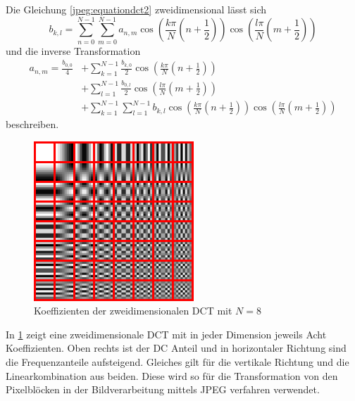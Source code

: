 Die Gleichung \eqref{jpeg:equationdct2} zweidimensional lässt sich
\begin{equation}
    b_{k,l}
    =
    \sum \limits_{n=0}^{N-1} 
    \sum \limits_{m=0}^{N-1} a_{n,m} 
    \cos\left(
    \frac{k\pi}{N}\left(n + \frac{1}{2} \right) 
    \right)
    \cos\left(
    \frac{l\pi}{N}\left(m + \frac{1}{2} \right) 
    \right)
    \label{jpeg:equationdct2dim2}
\end{equation}
und die inverse Transformation  
\begin{align*}
    a_{n,m}
    =
    \frac{b_{0,0}}{4} &+
    \sum \limits_{k=1}^{N-1} 
    \frac{b_{k,0}}{2} 
    \cos\left(
    \frac{k\pi}{N}\left(n + \frac{1}{2} \right) 
    \right) \\ &+
    \sum \limits_{l=1}^{N-1} 
    \frac{b_{0,l}}{2} 
    \cos\left(
    \frac{l\pi}{N}\left(m + \frac{1}{2} \right) 
    \right) \\ &+
    \sum \limits_{k=1}^{N-1} 
    \sum \limits_{l=1}^{N-1} b_{k,l} 
    \cos\left(
    \frac{k\pi}{N}\left(n + \frac{1}{2} \right) 
    \right)
    \cos\left(
    \frac{l\pi}{N}\left(m + \frac{1}{2} \right) 
    \right)
    \label{jpeg:equationdct3dim2}
\end{align*}
beschreiben.

\begin{figure}
    \centering
    \includegraphics[width=60mm]{papers/jpeg/pictures/dctjpeg.pdf}
    \caption{Koeffizienten der zweidimensionalen DCT mit \(N=8\)
        \label{jpeg:fig:dctkoeff}}
\end{figure}

In \ref{jpeg:fig:dctkoeff}  zeigt eine zweidimensionale DCT mit in jeder Dimension jeweils Acht Koeffizienten.
Oben rechts ist der DC Anteil und in horizontaler Richtung sind die Frequenzanteile aufsteigend.
Gleiches gilt für die vertikale Richtung und die Linearkombination aus beiden.
Diese wird so für die Transformation von den Pixelblöcken in der Bildverarbeitung mittels JPEG verfahren verwendet.

